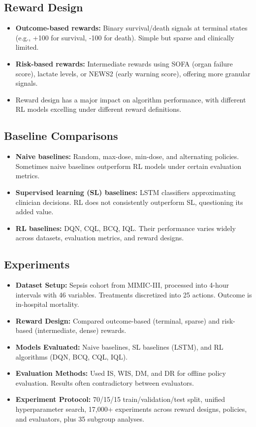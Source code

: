 \subsection*{Reward Design}
\begin{itemize}
    \item \textbf{Outcome-based rewards:} Binary survival/death signals at terminal states (e.g., +100 for survival, -100 for death). Simple but sparse and clinically limited.
    \item \textbf{Risk-based rewards:} Intermediate rewards using SOFA (organ failure score), lactate levels, or NEWS2 (early warning score), offering more granular signals.
    \item Reward design has a major impact on algorithm performance, with different RL models excelling under different reward definitions.
\end{itemize}

\subsection*{Baseline Comparisons}
\begin{itemize}
    \item \textbf{Naive baselines:} Random, max-dose, min-dose, and alternating policies. Sometimes naive baselines outperform RL models under certain evaluation metrics.
    \item \textbf{Supervised learning (SL) baselines:} LSTM classifiers approximating clinician decisions. RL does not consistently outperform SL, questioning its added value.
    \item \textbf{RL baselines:} DQN, CQL, BCQ, IQL. Their performance varies widely across datasets, evaluation metrics, and reward designs.
\end{itemize}

\subsection*{Experiments}
\begin{itemize}
    \item \textbf{Dataset Setup:} Sepsis cohort from MIMIC-III, processed into 4-hour intervals with 46 variables. Treatments discretized into 25 actions. Outcome is in-hospital mortality.
    \item \textbf{Reward Design:} Compared outcome-based (terminal, sparse) and risk-based (intermediate, dense) rewards.
    \item \textbf{Models Evaluated:} Naive baselines, SL baselines (LSTM), and RL algorithms (DQN, BCQ, CQL, IQL).
    \item \textbf{Evaluation Methods:} Used IS, WIS, DM, and DR for offline policy evaluation. Results often contradictory between evaluators.
    \item \textbf{Experiment Protocol:} 70/15/15 train/validation/test split, unified hyperparameter search, 17,000+ experiments across reward designs, policies, and evaluators, plus 35 subgroup analyses.
\end{itemize}

